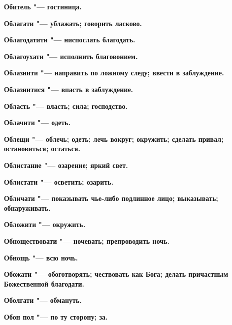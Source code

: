 \begin{multicols}{2}
\bfseries Обитель\normalfont{} "--- гостиница. 




\bfseries Облагати\normalfont{} "--- ублажать; говорить ласково. 




\bfseries Облагодатити\normalfont{} "--- ниспослать благодать. 




\bfseries Облагоухати\normalfont{} "--- исполнить благовонием. 




\bfseries Облазнити\normalfont{} "--- направить по ложному следу; ввести в заблуждение. 




\bfseries Облазнитися\normalfont{} "--- впасть в заблуждение. 




\bfseries Область\normalfont{} "--- власть; сила; господство. 




\bfseries Облачити\normalfont{} "--- одеть. 




\bfseries Облещи\normalfont{} "--- облечь; одеть; лечь вокруг; окружить; сделать привал; остановиться; остаться. 




\bfseries Облистание\normalfont{} "--- озарение; яркий свет. 




\bfseries Облистати\normalfont{} "--- осветить; озарить. 




\bfseries Обличати\normalfont{} "--- показывать чье-либо подлинное лицо; выказывать; обнаруживать. 




\bfseries Обложити\normalfont{} "--- окружить. 




\bfseries Обноществовати\normalfont{} "--- ночевать; препроводить ночь. 




\bfseries Обнощь\normalfont{} "--- всю ночь. 




\bfseries Обожати\normalfont{} "--- обоготворять; чествовать как Бога; делать причастным Божественной благодати. 




\bfseries Оболгати\normalfont{} "--- обмануть. 




\bfseries Обон пол\normalfont{} "--- по ту сторону; за. 





\end{multicols}
